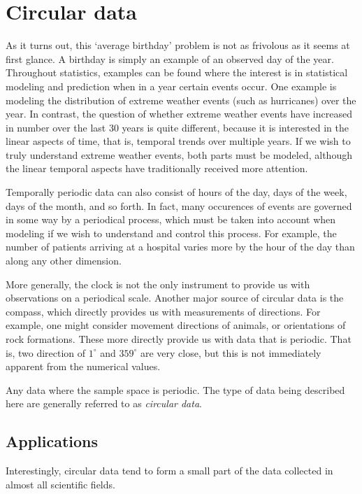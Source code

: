 \documentclass[12pt, a4paper]{book}\usepackage[]{graphicx}\usepackage[]{color}
\begin{document}
\section{Circular data}

As it turns out, this `average birthday' problem is not as frivolous as it seems at first glance. A birthday is simply an example of an observed day of the year. Throughout statistics, examples can be found where the interest is in statistical modeling and prediction when in a year certain events occur. One example is modeling the distribution of extreme weather events (such as hurricanes) over the year. In contrast, the question of whether extreme weather events have increased in number over the last 30 years is quite different, because it is interested in the linear aspects of time, that is, temporal trends over multiple years. If we wish to truly understand extreme weather events, both parts must be modeled, although the linear temporal aspects have traditionally received more attention.

Temporally periodic data can also consist of hours of the day, days of the week, days of the month, and so forth. In fact, many occurences of events are governed in some way by a periodical process, which must be taken into account when modeling if we wish to understand and control this process. For example, the number of patients arriving at a hospital varies more by the hour of the day than along any other dimension.

More generally, the clock is not the only instrument to provide us with observations on a periodical scale. Another major source of circular data is the compass, which directly provides us with measurements of directions. For example, one might consider movement directions of animals, or orientations of rock formations. These more directly provide us with data that is periodic. That is, two direction of $1^\circ$ and $359^\circ$ are very close, but this is not immediately apparent from the numerical values.

Any data where the sample space is periodic. The type of data being described here are generally referred to as \textit{circular data}.

\subsection{Applications}

Interestingly, circular data tend to form a small part of the data collected in almost all scientific fields.
\end{document}
